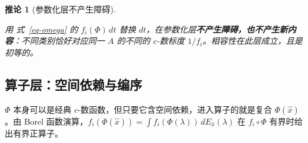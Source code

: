 \documentclass[
  chinese,
  a4paper,
  UTF8,
  12pt,
  oneside,
  openany]{ctexbook}
\theoremstyle{plain}
\theoremstyle{plain}
\theoremstyle{plain}
\theoremstyle{definition}
\theoremstyle{plain}
\newtheorem{corollary}{推论}[chapter]
\theoremstyle{plain}
\theoremstyle{remark}
\begin{document}
\begin{corollary}[参数化层不产生障碍]\protect\hypertarget{cor-param-compatible}{}\label{cor-param-compatible}

用 式~\ref{eq-omega} 的 \(f_i(\Phi)\,dt\) 替换
\(dt\)，在参数化层\textbf{不产生障碍，也不产生新内容}：不同类别恰好对应同一
\(A\) 的不同的 \(c\)-数标度 \(1/f_i\)。相容性在此层成立，且是初等的。

\end{corollary}

\subsection{算子层：空间依赖与编序}\label{ux7b97ux5b50ux5c42ux7a7aux95f4ux4f9dux8d56ux4e0eux7f16ux5e8f}

\(\Phi\) 本身可以是经典
\(c\)-数函数，但只要它含空间依赖，进入算子的就是复合
\(\Phi(\hat x)\)。由 Borel
函数演算，\(f_i(\Phi(\hat x))=\int f_i(\Phi(\lambda))\,dE_{\hat x}(\lambda)\)
在 \(f_i\circ\Phi\) 有界时给出有界正算子。
\end{document}
